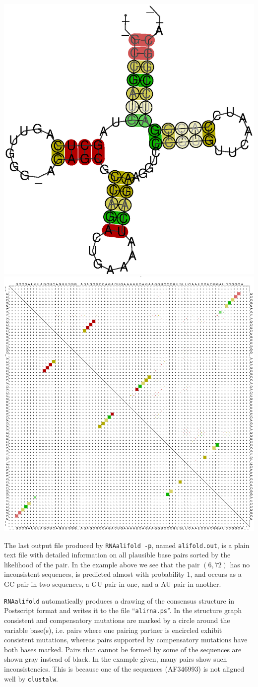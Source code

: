 \documentclass[a4paper]{article}
\begin{document}
\vspace*{1ex}
  \includegraphics[width=.48\textwidth]{Figures/alirna.eps}
  \includegraphics[width=.50\textwidth]{Figures/alidot.eps}

\noindent
The last output file produced by \texttt{RNAalifold -p}, named
\texttt{alifold.out}, is a plain text file with detailed information
on all plausible base pairs sorted by the likelihood of the pair.  In
the example above we see that the pair $(6,72)$ has no inconsistent
sequences, is predicted almost with probability 1, and occurs as a
\textsf{GC} pair in two sequences, a \textsf{GU} pair in one, and a
\textsf{AU} pair in another.

\noindent
\texttt{RNAalifold} automatically produces a drawing of the consensus
structure in Postscript format and writes it to the file
``\texttt{alirna.ps}''.  In the structure graph consistent and compensatory
mutations are marked by a circle around the variable base(s),
i.e. pairs where one pairing partner is encircled exhibit consistent
mutations, whereas pairs supported by compensatory mutations have both
bases marked. Pairs that cannot be formed by some of the sequences are
shown gray instead of black.
In the example given, many pairs show such inconsistencies. This is because
one of the sequences (AF346993) is not aligned well by \texttt{clustalw}.
\end{document}
